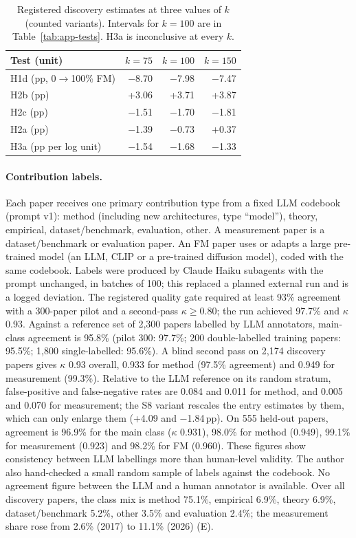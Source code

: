 \begin{table}[t]
\centering\footnotesize
\setlength{\tabcolsep}{4pt}
\begin{tabular}{@{}lrrr@{}}
\toprule
Test (unit) & $k=75$ & $k=100$ & $k=150$ \\
\midrule
H1d (pp, 0$\to$100\% FM) & $-$8.70 & $-$7.98 & $-$7.47 \\
H2b (pp) & +3.06 & +3.71 & +3.87 \\
H2c (pp) & $-$1.51 & $-$1.70 & $-$1.81 \\
H2a (pp) & $-$1.39 & $-$0.73 & +0.37 \\
H3a (pp per log unit) & $-$1.54 & $-$1.68 & $-$1.33 \\
\bottomrule
\end{tabular}
\caption{Registered discovery estimates at three values of $k$ (counted variants). Intervals for $k=100$ are in
Table~\ref{tab:app-tests}. H3a is inconclusive at every $k$.}
\label{tab:app-ktests}
\end{table}

\paragraph{Contribution labels.} Each paper receives one primary contribution type from a fixed LLM codebook (prompt
v1): method (including new architectures, type ``model''), theory, empirical, dataset/benchmark, evaluation, other.
A measurement paper is a dataset/benchmark or evaluation paper. An FM paper uses or adapts a large pre-trained model
(an LLM, CLIP or a pre-trained diffusion model), coded with the same codebook. Labels were produced by Claude Haiku
subagents with the prompt unchanged, in batches of 100; this replaced a planned external run and is a logged
deviation. The registered quality gate required at least 93\% agreement with a 300-paper pilot and a second-pass
$\kappa \geq 0.80$; the run achieved 97.7\% and $\kappa$ 0.93. Against a reference set of 2,300 papers labelled by
LLM annotators, main-class agreement is 95.8\% (pilot 300: 97.7\%; 200 double-labelled training papers: 95.5\%;
1,800 single-labelled: 95.6\%). A blind second pass on 2,174 discovery papers gives $\kappa$ 0.93 overall, 0.933 for
method (97.5\% agreement) and 0.949 for measurement (99.3\%). Relative to the LLM reference on its random stratum,
false-positive and false-negative rates are 0.084 and 0.011 for method, and 0.005 and 0.070 for measurement; the S8
variant rescales the entry estimates by them, which can only enlarge them (+4.09 and $-$1.84\,pp). On 555 held-out
papers, agreement is 96.9\% for the main class ($\kappa$ 0.931), 98.0\% for method (0.949), 99.1\% for measurement
(0.923) and 98.2\% for FM (0.960). These figures show consistency between LLM labellings more than human-level
validity. The author also hand-checked a small random sample of labels against the codebook.
No agreement figure between the LLM and a human annotator is available. Over all discovery papers, the class mix is method 75.1\%, empirical 6.9\%, theory 6.9\%, dataset/benchmark
5.2\%, other 3.5\% and evaluation 2.4\%; the measurement share rose from 2.6\% (2017) to 11.1\% (2026) (E).

